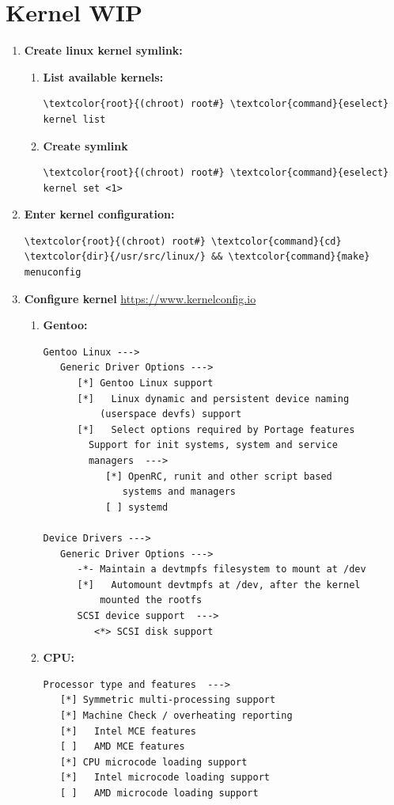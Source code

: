 \documentclass[10pt, a4paper, onecolumn, oneside, titlepage, openany]{book}
\begin{document}
\section{Kernel WIP}
\begin{enumerate}
    \item \textbf{Create linux kernel symlink:}
    \begin{enumerate}
        \item \textbf{List available kernels:}
\begin{Verbatim}[commandchars=\\\{\}]
\textcolor{root}{(chroot) root#} \textcolor{command}{eselect} kernel list
\end{Verbatim}
        \item \textbf{Create symlink}
\begin{Verbatim}[commandchars=\\\{\}]
\textcolor{root}{(chroot) root#} \textcolor{command}{eselect} kernel set <1>
\end{Verbatim}
    \end{enumerate}
    \item \textbf{Enter kernel configuration:}
\begin{Verbatim}[commandchars=\\\{\}]
\textcolor{root}{(chroot) root#} \textcolor{command}{cd} \textcolor{dir}{/usr/src/linux/} && \textcolor{command}{make} menuconfig
\end{Verbatim}
    \item \textbf{Configure kernel}
\newline \url{https://www.kernelconfig.io}
    \begin{enumerate}
\item \textbf{Gentoo:}
\begin{Verbatim}[commandchars=\\\{\}]
Gentoo Linux --->
   Generic Driver Options --->
      [*] Gentoo Linux support
      [*]   Linux dynamic and persistent device naming
          (userspace devfs) support
      [*]   Select options required by Portage features
        Support for init systems, system and service
        managers  --->
           [*] OpenRC, runit and other script based
              systems and managers
           [ ] systemd

Device Drivers --->
   Generic Driver Options --->
      -*- Maintain a devtmpfs filesystem to mount at /dev
      [*]   Automount devtmpfs at /dev, after the kernel
          mounted the rootfs
      SCSI device support  --->
         <*> SCSI disk support
\end{Verbatim}
        \item \textbf{CPU:}
\begin{Verbatim}[commandchars=\\\{\}]
Processor type and features  --->
   [*] Symmetric multi-processing support
   [*] Machine Check / overheating reporting
   [*]   Intel MCE features
   [ ]   AMD MCE features
   [*] CPU microcode loading support
   [*]   Intel microcode loading support
   [ ]   AMD microcode loading support


\end{Verbatim}
\end{enumerate}
\end{enumerate}
\end{document}
